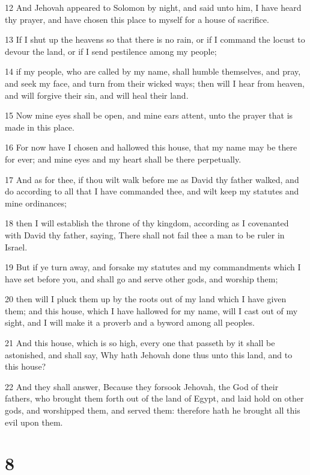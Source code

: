 \par 12 And Jehovah appeared to Solomon by night, and said unto him, I have heard thy prayer, and have chosen this place to myself for a house of sacrifice.
\par 13 If I shut up the heavens so that there is no rain, or if I command the locust to devour the land, or if I send pestilence among my people;
\par 14 if my people, who are called by my name, shall humble themselves, and pray, and seek my face, and turn from their wicked ways; then will I hear from heaven, and will forgive their sin, and will heal their land.
\par 15 Now mine eyes shall be open, and mine ears attent, unto the prayer that is made in this place.
\par 16 For now have I chosen and hallowed this house, that my name may be there for ever; and mine eyes and my heart shall be there perpetually.
\par 17 And as for thee, if thou wilt walk before me as David thy father walked, and do according to all that I have commanded thee, and wilt keep my statutes and mine ordinances;
\par 18 then I will establish the throne of thy kingdom, according as I covenanted with David thy father, saying, There shall not fail thee a man to be ruler in Israel.
\par 19 But if ye turn away, and forsake my statutes and my commandments which I have set before you, and shall go and serve other gods, and worship them;
\par 20 then will I pluck them up by the roots out of my land which I have given them; and this house, which I have hallowed for my name, will I cast out of my sight, and I will make it a proverb and a byword among all peoples.
\par 21 And this house, which is so high, every one that passeth by it shall be astonished, and shall say, Why hath Jehovah done thus unto this land, and to this house?
\par 22 And they shall answer, Because they forsook Jehovah, the God of their fathers, who brought them forth out of the land of Egypt, and laid hold on other gods, and worshipped them, and served them: therefore hath he brought all this evil upon them.

\chapter{8}


